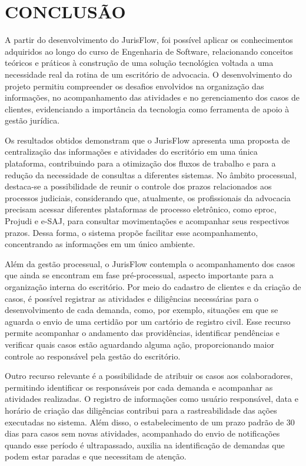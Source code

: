 \chapter{CONCLUSÃO}
A partir do desenvolvimento do JurisFlow, foi possível aplicar os conhecimentos adquiridos ao longo do curso de Engenharia de Software, relacionando conceitos teóricos e práticos à construção de uma solução tecnológica voltada a uma necessidade real da rotina de um escritório de advocacia. O desenvolvimento do projeto permitiu compreender os desafios envolvidos na organização das informações, no acompanhamento das atividades e no gerenciamento dos casos de clientes, evidenciando a importância da tecnologia como ferramenta de apoio à gestão jurídica.

Os resultados obtidos demonstram que o JurisFlow apresenta uma proposta de centralização das informações e atividades do escritório em uma única plataforma, contribuindo para a otimização dos fluxos de trabalho e para a redução da necessidade de consultas a diferentes sistemas. No âmbito processual, destaca-se a possibilidade de reunir o controle dos prazos relacionados aos processos judiciais, considerando que, atualmente, os profissionais da advocacia precisam acessar diferentes plataformas de processo eletrônico, como eproc, Projudi e e-SAJ, para consultar movimentações e acompanhar seus respectivos prazos. Dessa forma, o sistema propõe facilitar esse acompanhamento, concentrando as informações em um único ambiente.

Além da gestão processual, o JurisFlow contempla o acompanhamento dos casos que ainda se encontram em fase pré-processual, aspecto importante para a organização interna do escritório. Por meio do cadastro de clientes e da criação de casos, é possível registrar as atividades e diligências necessárias para o desenvolvimento de cada demanda, como, por exemplo, situações em que se aguarda o envio de uma certidão por um cartório de registro civil. Esse recurso permite acompanhar o andamento das providências, identificar pendências e verificar quais casos estão aguardando alguma ação, proporcionando maior controle ao responsável pela gestão do escritório.

Outro recurso relevante é a possibilidade de atribuir os casos aos colaboradores, permitindo identificar os responsáveis por cada demanda e acompanhar as atividades realizadas. O registro de informações como usuário responsável, data e horário de criação das diligências contribui para a rastreabilidade das ações executadas no sistema. Além disso, o estabelecimento de um prazo padrão de 30 dias para casos sem novas atividades, acompanhado do envio de notificações quando esse período é ultrapassado, auxilia na identificação de demandas que podem estar paradas e que necessitam de atenção.

